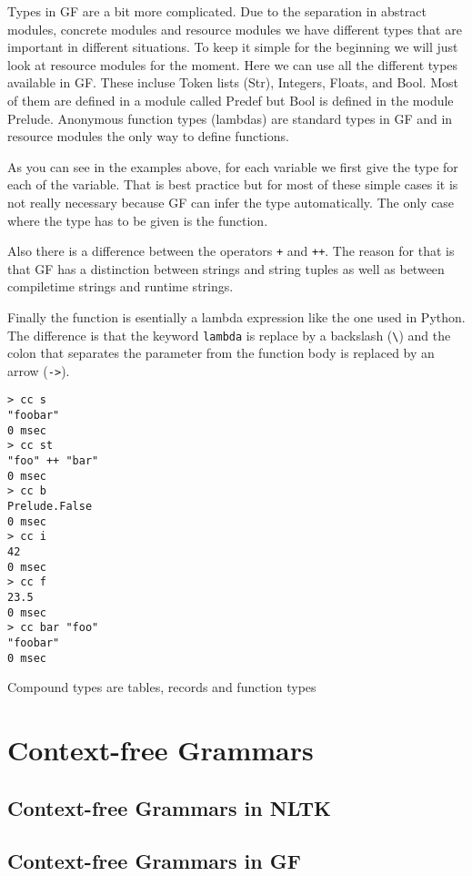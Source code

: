 \documentclass{scrartcl}
\begin{document}
Types in GF are a bit more complicated. Due to the separation in abstract modules, concrete modules and resource modules we have different types that are important in different situations. To keep it simple for the beginning we will just look at resource modules for the moment. Here we can use all the different types available in GF. These incluse Token lists (Str), Integers, Floats, and Bool. Most of them are defined in a module called Predef but Bool is defined in the module Prelude. Anonymous function types (lambdas) are standard types in GF and in resource modules the only way to define functions.



As you can see in the examples above, for each variable we first give the type for each of the variable. That is best practice but for most of these simple cases it is not really necessary because GF can infer the type automatically. The only case where the type has to be given is the function.

Also there is a difference between the operators \texttt{+} and \texttt{++}. The reason for that is that GF has a distinction between strings and string tuples as well as between compiletime strings and runtime strings.

Finally the function is esentially a lambda expression like the one used in Python. The difference is that the keyword \texttt{lambda} is replace by a backslash (\texttt{\textbackslash}) and the colon that separates the parameter from the function body is replaced by an arrow (\texttt{->}).

\begin{verbatim}
> cc s
"foobar"
0 msec
> cc st
"foo" ++ "bar"
0 msec
> cc b
Prelude.False
0 msec
> cc i
42
0 msec
> cc f
23.5
0 msec
> cc bar "foo"
"foobar"
0 msec
\end{verbatim}

Compound types are tables, records and function types
\section{Context-free Grammars}
\subsection{Context-free Grammars in NLTK}
\subsection{Context-free Grammars in GF}
\end{document}
